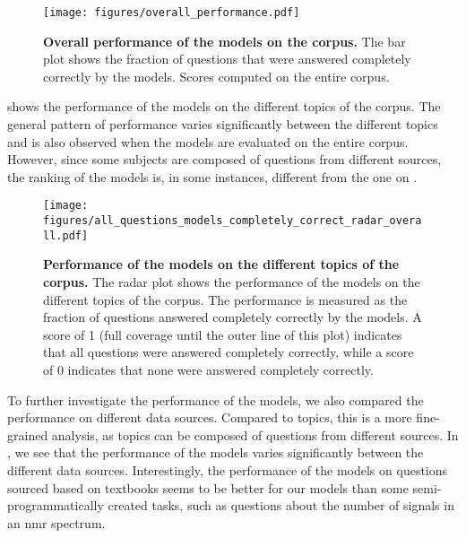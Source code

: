 \begin{figure}[htb]
    \centering
    \texttt{[image: figures/overall\_performance.pdf]}
    \caption{\textbf{Overall performance of the models on the \chembench corpus.} The bar plot shows the fraction of questions that were answered completely correctly by the models. Scores computed on the entire \chembench corpus.}
    \label{fig:barplot_all_correct_all_questions}
\end{figure}

 shows the performance of the models on the different topics of the \chembench corpus.
The general pattern of performance varies significantly between the different topics and is also observed when the models are evaluated on the entire corpus.
However, since some subjects are composed of questions from different sources, the ranking of the models is, in some instances, different from the one on \chembenchmini.

\begin{figure}[htb]
    \centering
    \texttt{[image: figures/all\_questions\_models\_completely\_correct\_radar\_overall.pdf]}
    \caption{\textbf{Performance of the models on the different topics of the \chembench corpus.} The radar plot shows the performance of the models on the different topics of the \chembench corpus. The performance is measured as the fraction of questions answered completely correctly by the models.
    A score of 1 (full coverage until the outer line of this plot) indicates that all questions were answered completely correctly, while a score of 0 indicates that none were answered completely correctly.
    }
    \label{fig:all_questions_models_completely_correct_radar_overall}
\end{figure}




To further investigate the performance of the models, we also compared the performance on different data sources.
Compared to topics, this is a more fine-grained analysis, as topics can be composed of questions from different sources.
In , we see that the performance of the models varies significantly between the different data sources.
Interestingly, the performance of the models on questions sourced based on textbooks seems to be better for our models than some semi-programmatically created tasks, such as questions about the number of signals in an \gls{nmr} spectrum.


